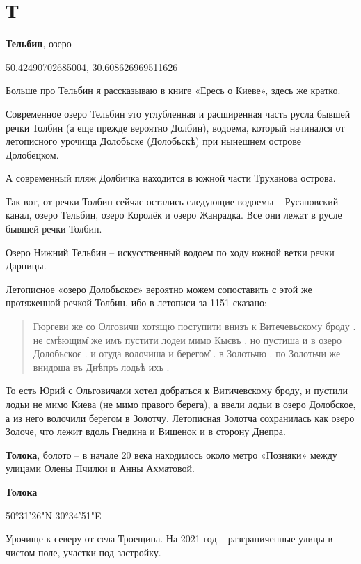 \chapter*{Т}

\textbf{Тельбин}, озеро

50.42490702685004, 30.608626969511626

Больше про Тельбин я рассказываю в книге «Ересь о Киеве», здесь же кратко.

Современное озеро Тельбин это углубленная и расширенная часть русла бывшей речки Толбин (а еще прежде вероятно Долбин), водоема, который начинался от летописного урочища Долобьске (Долобьскѣ) при нынешнем острове Долобецком. 

А современный пляж Долбичка находится в южной части Труханова острова.

Так вот, от речки Толбин сейчас остались следующие водоемы – Русановский канал, озеро Тельбин, озеро Королёк и озеро Жанрадка. Все они лежат в русле бывшей речки Толбин.

Озеро Нижний Тельбин – искусственный водоем по ходу южной ветки речки Дарницы.

Летописное «озеро Долобьскоє» вероятно можем сопоставить с этой же протяженной речкой Толбин, ибо в летописи за 1151 сказано:

\begin{quotation}
Гюргеви же со Олговичи хотящю поступити внизъ к Витечевьскому броду . не смѣющим̑ же имъ пустити лодеи мимо Кыєвъ . но пустиша и в озеро Долобьскоє . и отуда волочиша и берегом̑ . в Золотьчю . по Золотьчи же внидоша въ Днѣпръ лодьѣ ихъ .
\end{quotation}

То есть Юрий с Ольговичами хотел добраться к Витичевскому броду, и пустили лодьи не мимо Киева (не мимо правого берега), а ввели лодьи в озеро Долобское, а из него волочили берегом в Золотчу. Летописная Золотча сохранилась как озеро Золоче, что лежит вдоль Гнедина и Вишенок и в сторону Днепра.\\

\medskip


\textbf{Толока}, болото – в начале 20 века находилось около метро «Позняки» между улицами Олены Пчилки и Анны Ахматовой.\\

\medskip

\textbf{Толока}

50°31'26"N 30°34'51"E

Урочище к северу от села Троещина. На 2021 год – разграниченные улицы в чистом поле, участки под застройку.\\

